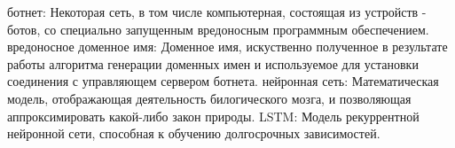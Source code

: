 
\noindent ботнет: Некоторая сеть, в том числе компьютерная, состоящая из устройств - ботов, со специально запущенным вредоносным программным обеспечением.
\newline
\linebreak
\noindent вредоносное доменное имя: Доменное имя, искуственно полученное в результате работы алгоритма генерации доменных имен и используемое для установки соединения с управляющем сервером ботнета.
\newline
\linebreak
\noindent нейронная сеть: Математическая модель, отображающая деятельность билогического мозга, и позволяющая аппроксимировать какой-либо закон природы.
\newline
\linebreak
\noindent LSTM: Модель рекуррентной нейронной сети, способная к обучению долгосрочных зависимостей.
\clearpage